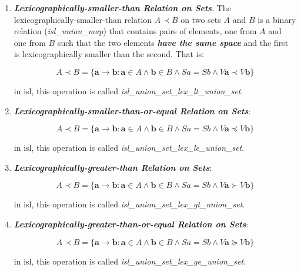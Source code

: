 \begin{enumerate}
  \item \textcolor{vr}{\textbf{\emph{Lexicographically-smaller-than Relation on Sets}}}. The lexicographically-smaller-than relation $A \prec B$ on two sets $A$ and $B$ is a binary relation (\textcolor{pg}{\emph{isl\_union\_map}}) that contains pairs of elements, one from $A$ and one from $B$ such that the two elements \textbf{\textit{have the same space}} and the first is lexicographically smaller than the second. That is:

  $$A \prec B = \{ \mathbf{a} \rightarrow \mathbf{b} : \mathbf{a} \in A \wedge \mathbf{b} \in B
  \wedge \mathit{S}a = \mathit{S}b \wedge \mathit{V}\mathbf{a} \prec \mathit{V}\mathbf{b}\}$$

  in isl, this operation is called \textcolor{pg}{\emph{isl\_union\_set\_lex\_lt\_union\_set}}.

  \item \textcolor{vr}{\textbf{\emph{Lexicographically-smaller-than-or-equal Relation on Sets}}}:

  $$A \prec B = \{ \mathbf{a} \rightarrow \mathbf{b} : \mathbf{a} \in A \wedge \mathbf{b} \in B
  \wedge \mathit{S}a = \mathit{S}b \wedge \mathit{V}\mathbf{a} \preccurlyeq \mathit{V}\mathbf{b}\}$$

  in isl, this operation is called \textcolor{pg}{\emph{isl\_union\_set\_lex\_le\_union\_set}}.

  \item \textcolor{vr}{\textbf{\emph{Lexicographically-greater-than Relation on Sets}}}:

  $$A \prec B = \{ \mathbf{a} \rightarrow \mathbf{b} : \mathbf{a} \in A \wedge \mathbf{b} \in B
  \wedge \mathit{S}a = \mathit{S}b \wedge \mathit{V}\mathbf{a} \succ \mathit{V}\mathbf{b}\}$$

  in isl, this operation is called \textcolor{pg}{\emph{isl\_union\_set\_lex\_gt\_union\_set}}.

  \item \textcolor{vr}{\textbf{\emph{Lexicographically-greater-than-or-equal Relation on Sets}}}:

  $$A \prec B = \{ \mathbf{a} \rightarrow \mathbf{b} : \mathbf{a} \in A \wedge \mathbf{b} \in B
  \wedge \mathit{S}a = \mathit{S}b \wedge \mathit{V}\mathbf{a} \succcurlyeq \mathit{V}\mathbf{b}\}$$

  in isl, this operation is called \textcolor{pg}{\emph{isl\_union\_set\_lex\_ge\_union\_set}}.

\end{enumerate}

